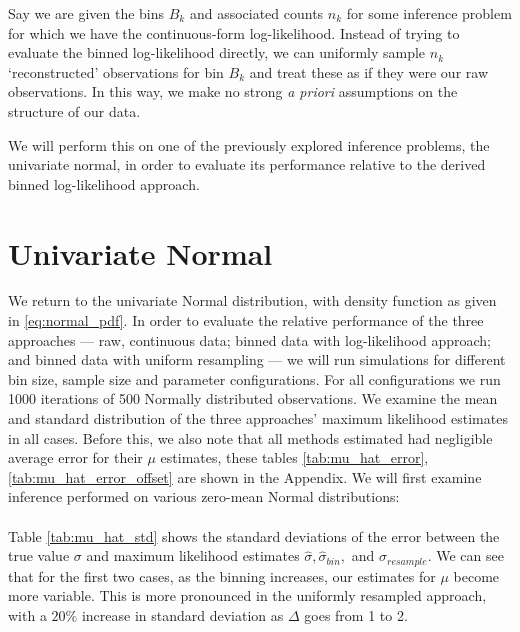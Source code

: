 \documentclass[11pt,a4,twosided,singlespacing,titlepagenumber=on,numbers=endperiod]{scrreprt}
\numberwithin{equation}{chapter} %
\theoremstyle{remark}
\begin{document}
Say we are given the bins $B_k$ and associated counts $n_k$ for some inference problem for which we have the continuous-form log-likelihood. Instead of trying to evaluate the binned log-likelihood directly, we can uniformly sample $n_k$ `reconstructed' observations for bin $B_k$ and treat these as if they were our raw observations. In this way, we make no strong \emph{a priori} assumptions on the structure of our data.

We will perform this on one of the previously explored inference problems, the univariate normal, in order to evaluate its performance relative to the derived binned log-likelihood approach.

\section{Univariate Normal}
We return to the univariate Normal distribution, with density function as given in \ref{eq:normal_pdf}. In order to evaluate the relative performance of the three approaches --- raw, continuous data; binned data with log-likelihood approach; and binned data with uniform resampling --- we will run simulations for different bin size, sample size and parameter configurations. For all configurations we run 1000 iterations of 500 Normally distributed observations. We examine the mean and standard distribution of the three approaches' maximum likelihood estimates in all cases. Before this, we also note that all methods estimated had negligible average error for their $\mu$ estimates, these tables \ref{tab:mu_hat_error}, \ref{tab:mu_hat_error_offset} are shown in the Appendix.
\newpage\noindent
We will first examine inference performed on various zero-mean Normal distributions:\\\\
Table \ref{tab:mu_hat_std} shows the standard deviations of the error between the true value $\sigma$ and maximum likelihood estimates $\hat{\sigma}, \hat{\sigma}_{bin}, $ and $\hat{\sigma}_{resample}$. We can see that for the first two cases, as the binning increases, our estimates for $\mu$ become more variable. This is more pronounced in the uniformly resampled approach, with a $20\%$ increase in standard deviation as $\Delta$ goes from 1 to 2.
\end{document}
